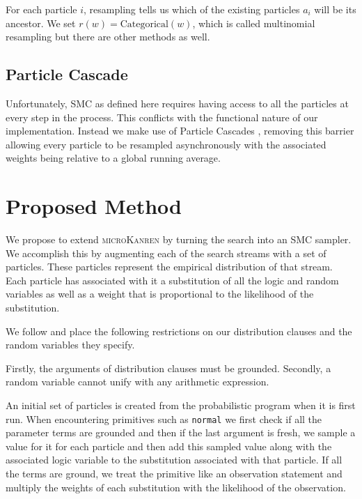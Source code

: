 \documentclass[
]{ceurart}
\begin{document}
For each particle $i$, resampling tells us which of the existing
particles $a_i$ will be its ancestor. We set $r(w) =
\text{Categorical}(w)$, which is called multinomial resampling but
there are other methods as well\cite{douc2005comparison}.

\subsection{Particle Cascade}

Unfortunately, SMC as defined here requires having access to all the
particles at every step in the process. This conflicts with the
functional nature of our implementation. Instead we make use of
Particle Cascades \cite{PaigeWDT14}, removing this barrier allowing every
particle to be resampled asynchronously with the associated weights
being relative to a global running average. %

\section{Proposed Method}

We propose to extend \textsc{microKanren} by turning the search into an
SMC sampler. We accomplish this by augmenting each of the search
streams with a set of particles. These particles represent the
empirical distribution of that stream. Each particle has associated
with it a substitution of all the logic and random variables as well
as a weight that is proportional to the likelihood of the
substitution.

We follow \cite{gutmann2010extending} and place the following restrictions
on our distribution clauses and the random variables they specify.

Firstly, the arguments of distribution clauses must be
grounded. Secondly, a random variable cannot unify with any arithmetic
expression.

An initial set of particles is created from the probabilistic program
when it is first run. When encountering primitives such as
\texttt{normal} we first check if all the parameter terms are grounded
and then if the last argument is fresh, we sample a value for it for
each particle and then add this sampled value along with the
associated logic variable to the substitution associated with that
particle. If all the terms are ground, we treat the primitive like an
observation statement and multiply the weights of each substitution
with the likelihood of the observation.
\end{document}
